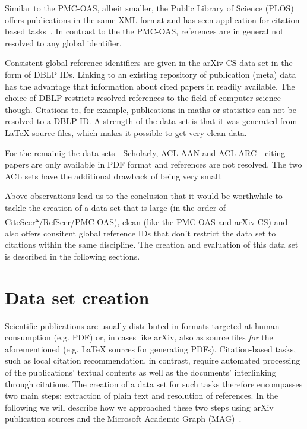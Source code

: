 Similar to the PMC-OAS, albeit smaller, the Public Library of Science (PLOS) offers publications in the same XML format and has seen application for citation based tasks~\cite{Bertin2016,Bertin2018}. In contrast to the the PMC-OAS, references are in general not resolved to any global identifier.

Consistent global reference identifiers are given in the arXiv CS data set in the form of DBLP IDs. Linking to an existing repository of publication (meta) data has the advantage that information about cited papers in readily available. The choice of DBLP restricts resolved references to the field of computer science though. Citations to, for example, publications in maths or statistics can not be resolved to a DBLP ID. A strength of the data set is that it was generated from \LaTeX{} source files, which makes it possible to get very clean data.

For the remainig the data sets---Scholarly, ACL-AAN and ACL-ARC---citing papers are only available in PDF format and references are not resolved. The two ACL sets have the additional drawback of being very small.

Above observations lead us to the conclusion that it would be worthwhile to tackle the creation of a data set that is large (in the order of CiteSeer\textsuperscript{x}/RefSeer/PMC-OAS), clean (like the PMC-OAS and arXiv CS) and also offers consitent global reference IDs that don't restrict the data set to citations within the same discipline. The creation and evaluation of this data set is described in the following sections.



\section{Data set creation}\label{sec:data-set-creation}
Scientific publications are usually distributed in formats targeted at human consumption (e.g. PDF) or, in cases like arXiv, also as source files \emph{for} the aforementioned (e.g. \LaTeX{} sources for generating PDFs). Citation-based tasks, such as local citation recommendation, in contrast, require automated processing of the publications' textual contents as well as the documents' interlinking through citations. The creation of a data set for such tasks therefore encompasses two main steps: extraction of plain text and resolution of references. In the following we will describe how we approached these two steps using arXiv publication sources and the Microsoft Academic Graph (MAG)~\cite{Sinha2015}.


